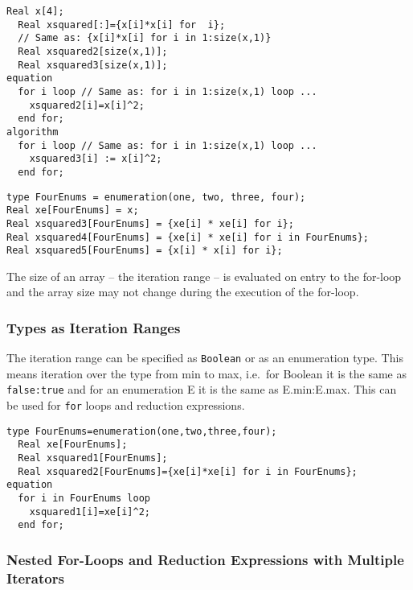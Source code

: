 \begin{example}
\begin{lstlisting}[language=modelica]
  Real x[4];
  Real xsquared[:]={x[i]*x[i] for  i};
  // Same as: {x[i]*x[i] for i in 1:size(x,1)}
  Real xsquared2[size(x,1)];
  Real xsquared3[size(x,1)];
equation
  for i loop // Same as: for i in 1:size(x,1) loop ...
    xsquared2[i]=x[i]^2;
  end for;
algorithm
  for i loop // Same as: for i in 1:size(x,1) loop ...
    xsquared3[i] := x[i]^2;
  end for;
\end{lstlisting}

\begin{lstlisting}[language=modelica]
type FourEnums = enumeration(one, two, three, four);
Real xe[FourEnums] = x;
Real xsquared3[FourEnums] = {xe[i] * xe[i] for i};
Real xsquared4[FourEnums] = {xe[i] * xe[i] for i in FourEnums};
Real xsquared5[FourEnums] = {x[i] * x[i] for i};
\end{lstlisting}
\end{example}

The size of an array -- the iteration range -- is evaluated on entry to the for-loop and the array size may not change during the execution of the for-loop.

\subsubsection{Types as Iteration Ranges }\label{types-as-iteration-ranges}

The iteration range can be specified as \lstinline!Boolean! or as an enumeration
type. This means iteration over the type from min to max, i.e.\ for
Boolean it is the same as \lstinline!false:true! and for an enumeration E it is the
same as E.min:E.max. This can be used for \lstinline!for! loops and reduction
expressions.

\begin{example}
\begin{lstlisting}[language=modelica]
  type FourEnums=enumeration(one,two,three,four);
  Real xe[FourEnums];
  Real xsquared1[FourEnums];
  Real xsquared2[FourEnums]={xe[i]*xe[i] for i in FourEnums};
equation
  for i in FourEnums loop
    xsquared1[i]=xe[i]^2;
  end for;
\end{lstlisting}
\end{example}

\subsubsection{Nested For-Loops and Reduction Expressions with Multiple Iterators}\label{nested-for-loops-and-reduction-expressions-with-multiple-iterators}

